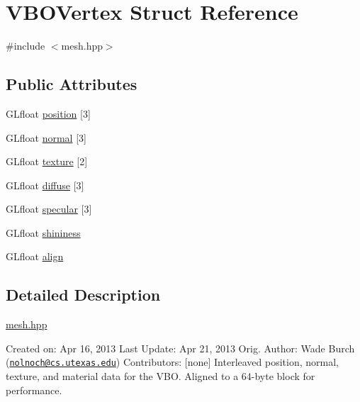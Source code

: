 \hypertarget{structVBOVertex}{\section{V\-B\-O\-Vertex Struct Reference}
\label{structVBOVertex}
}


{\ttfamily \#include $<$mesh.\-hpp$>$}

\subsection*{Public Attributes}
\begin{DoxyCompactItemize}
\item 
G\-Lfloat \hyperlink{structVBOVertex_aa0ce514d26cbbdbfab7ffba3c5b53e2e}{position} \mbox{[}3\mbox{]}
\item 
G\-Lfloat \hyperlink{structVBOVertex_abf03d625c89963c0b39d4d3cd59fafb2}{normal} \mbox{[}3\mbox{]}
\item 
G\-Lfloat \hyperlink{structVBOVertex_a66eb5e96270293ec950bbd9fe1773424}{texture} \mbox{[}2\mbox{]}
\item 
G\-Lfloat \hyperlink{structVBOVertex_aab28e81480a342a61ce79b74702fccc5}{diffuse} \mbox{[}3\mbox{]}
\item 
G\-Lfloat \hyperlink{structVBOVertex_a35725f03472cebdfea1aaa98dac0aa1b}{specular} \mbox{[}3\mbox{]}
\item 
G\-Lfloat \hyperlink{structVBOVertex_a6a650b656bade90ee41ae7dded37c7d1}{shininess}
\item 
G\-Lfloat \hyperlink{structVBOVertex_a6b0bd5c23010ff965be5f0e363794e2e}{align}
\end{DoxyCompactItemize}


\subsection{Detailed Description}
\hyperlink{mesh_8hpp_source}{mesh.\-hpp}

Created on\-: Apr 16, 2013 Last Update\-: Apr 21, 2013 Orig. Author\-: Wade Burch (\href{mailto:nolnoch@cs.utexas.edu}{\tt nolnoch@cs.\-utexas.\-edu}) Contributors\-: \mbox{[}none\mbox{]} Interleaved position, normal, texture, and material data for the V\-B\-O. Aligned to a 64-\/byte block for performance. 

